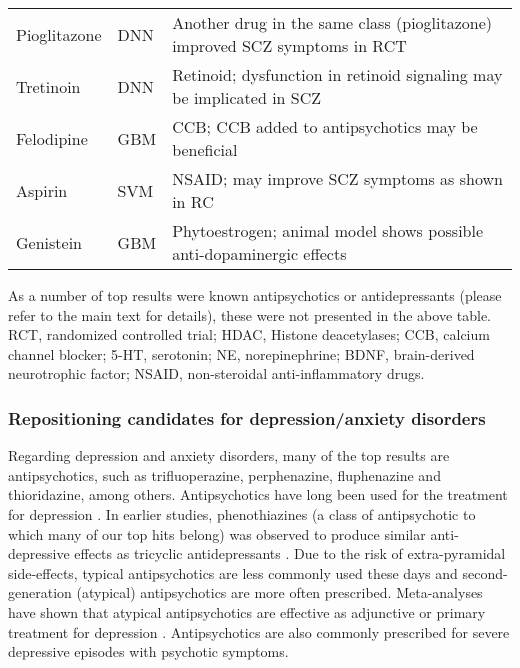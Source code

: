 \begin{sidewaystable}
\begin{threeparttable}
\begin{tabular}{lll}
        Pioglitazone & DNN   & Another drug in the same class (pioglitazone) improved SCZ symptoms in RCT \\
        Tretinoin & DNN   & Retinoid; dysfunction in retinoid signaling may be implicated in SCZ \\
        Felodipine & GBM   & CCB; CCB added to antipsychotics may be beneficial \\
        Aspirin                        & SVM   & NSAID; may improve SCZ symptoms as shown in RC \\
        Genistein                                          & GBM   & Phytoestrogen; animal model shows possible anti-dopaminergic effects \\
        \bottomrule
        \end{tabular}%
        \begin{tablenotes}
          \item As a number of top results were known antipsychotics or antidepressants (please refer to the main text for details), these were not presented in the above table. RCT, randomized controlled trial; HDAC, Histone deacetylases; CCB, calcium channel blocker; 5-HT, serotonin; NE, norepinephrine; BDNF, brain-derived neurotrophic factor; NSAID, non-steroidal anti-inflammatory drugs.
        \end{tablenotes}
      \end{threeparttable}
      \label{tab:repurposing_literature_candidates}%
    \end{sidewaystable}%
  
    \subsubsection{Repositioning candidates for depression/anxiety disorders}
      Regarding depression and anxiety disorders, many of the top results are antipsychotics, such as trifluoperazine, perphenazine, fluphenazine and thioridazine, among others. Antipsychotics have long been used for the treatment for depression \cite{wang2017webgestalt}. In earlier studies, phenothiazines (a class of antipsychotic to which many of our top hits belong) was observed to produce similar anti-depressive effects as tricyclic antidepressants \cite{robertson1982major}. Due to the risk of extra-pyramidal side-effects, typical antipsychotics are less commonly used these days and second-generation (atypical) antipsychotics are more often prescribed. Meta-analyses have shown that atypical antipsychotics are effective as adjunctive or primary treatment for depression \cite{robertson1982major,spielmans2016adjunctive}. Antipsychotics are also commonly prescribed for severe depressive episodes with psychotic symptoms. 

